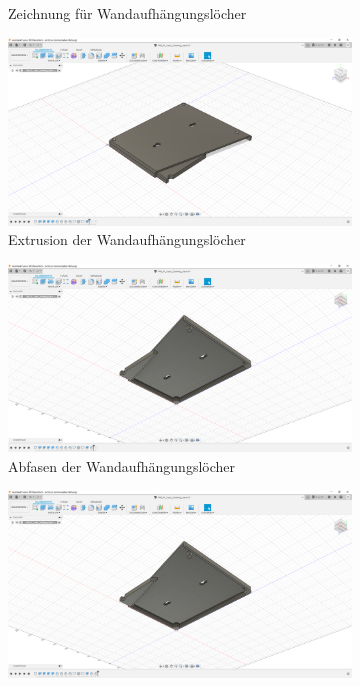 \begin{figure}[H]
\begin{subfigure}[t]{.3\linewidth}
		\caption[Zeichnung für Wandaufhängungslöcher]{Zeichnung für Wandaufhängungslöcher}
		\label{fig:design-back-12}
	\end{subfigure}
	\begin{subfigure}[t]{.3\linewidth}
		\includegraphics[width=\linewidth]{img/konstruktion_gehaeuse_hinten_013.png}
		\caption[Extrusion der Wandaufhängungslöcher]{Extrusion der Wandaufhängungslöcher}
		\label{fig:design-back-13}
	\end{subfigure}
	\begin{subfigure}[t]{.3\linewidth}
		\includegraphics[width=\linewidth]{img/konstruktion_gehaeuse_hinten_014.png}
		\caption[Abfasen der Wandaufhängungslöcher]{Abfasen der Wandaufhängungslöcher}
		\label{fig:design-back-14}
	\end{subfigure}
	\begin{subfigure}[t]{.3\linewidth}
		\includegraphics[width=\linewidth]{img/konstruktion_gehaeuse_hinten_015.png}

\end{subfigure}
\end{figure}
